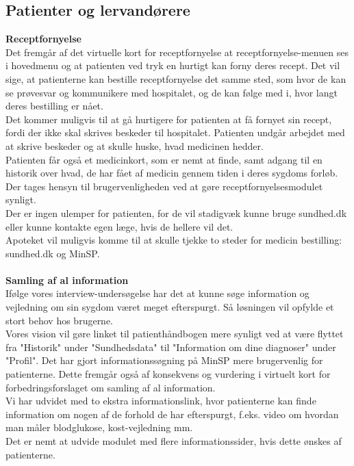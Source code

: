 \subsection{Patienter og lervandørere}
\textbf{Receptfornyelse}\\
Det fremgår af det virtuelle kort for receptfornyelse at receptfornyelse-menuen ses i hovedmenu og at patienten ved tryk en hurtigt kan forny deres recept. Det vil sige, at patienterne kan bestille receptfornyelse det samme sted, som hvor de kan se prøvesvar og kommunikere med hospitalet, og de kan følge med i, hvor langt deres bestilling er nået.\\
Det kommer muligvis til at gå hurtigere for patienten at få fornyet sin recept, fordi der ikke skal skrives beskeder til hospitalet. Patienten undgår arbejdet med at skrive beskeder og at skulle huske, hvad medicinen hedder.\\
Patienten får også et medicinkort, som er nemt at finde, samt adgang til en historik over hvad, de har fået af medicin gennem tiden i deres sygdoms forløb.\\
Der tages hensyn til brugervenligheden ved at gøre receptfornyelsesmodulet synligt.\\ 
Der er ingen ulemper for patienten, for de vil stadigvæk kunne bruge sundhed.dk eller kunne kontakte egen læge, hvis de hellere vil det.\\
Apoteket vil muligvis komme til at skulle tjekke to steder for medicin bestilling: sundhed.dk og MinSP.
\\\\
\textbf{Samling af al information}\\
Ifølge vores interview-undersøgelse har det at kunne søge information og vejledning om sin sygdom været meget efterspurgt. Så løsningen vil opfylde et stort behov hos brugerne. \\
Vores vision vil gøre linket til patienthåndbogen mere synligt ved at være flyttet fra "Historik" under "Sundhedsdata" til "Information om dine diagnoser" under "Profil". Det har gjort informationssøgning på MinSP mere brugervenlig for patienterne. Dette fremgår også af konsekvens og vurdering i virtuelt kort for forbedringsforslaget om samling af al information.\\
Vi har udvidet med to ekstra informationslink, hvor patienterne kan finde information om nogen af de forhold de har efterspurgt, f.eks. video om hvordan man måler blodglukose, kost-vejledning mm.\\
Det er nemt at udvide modulet med flere informationssider, hvis dette ønskes af patienterne.\\
